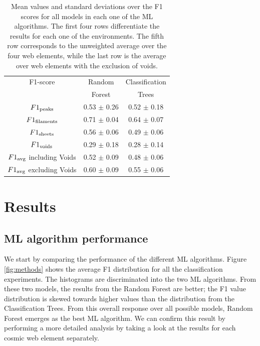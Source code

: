 \documentclass[usenatbib]{mnras}
\begin{document}
\begin{table}
\centering
\begin{tabular}{ccc}
\hline
 F1-score                   & Random                 & Classification                \\
                            & Forest                 &   
                            Trees \\
\hline
 $F1_{\rm peaks}$               & 0.53 $\pm$ 0.26 & 0.52 $\pm$ 0.18  \\
 $F1_{\rm filaments}$           & 0.71 $\pm$ 0.04 & 0.64 $\pm$ 0.07  \\
 $F1_{\rm sheets}$              & 0.56 $\pm$ 0.06 & 0.49 $\pm$ 0.06 \\
 $F1_{\rm voids}$               & 0.29 $\pm$ 0.18 & 0.28 $\pm$ 0.14 \\
 ${F1}_{\rm avg}$ including Voids    & 0.52 $\pm$ 0.09 & 0.48 $\pm$ 0.06 \\
 ${F1}_{\rm avg}$ excluding Voids & 0.60 $\pm$ 0.09 & 0.55 $\pm$ 0.06 \\
\hline
\end{tabular}
\caption{Mean values and standard deviations over the F1
  scores for all models in each one of the ML algorithms.
  The first four rows differentiate the results for each one of the
  environments.
  The fifth row corresponds to the unweighted average over the four
  web elements, while the last row is the average over web elements
  with the exclusion of voids.}
\label{table:elements}
\end{table}


\section{Results}\label{sec:results}

\subsection{ML algorithm performance}


We start by comparing the performance of the different ML algorithms.
Figure \ref{fig:methods} shows the average F1 distribution for
all the classification experiments. 
The histograms are discriminated into the two ML algorithms.
From these two models, the results from the Random Forest are
better; the F1 value distribution is skewed towards higher values than
the distribution from the Classification Trees.
From this overall response over all possible models, Random Forest
emerges as the best ML algorithm.
We can confirm this result by performing a more detailed analysis by
taking a look at the results for each cosmic web element separately.
\end{document}

